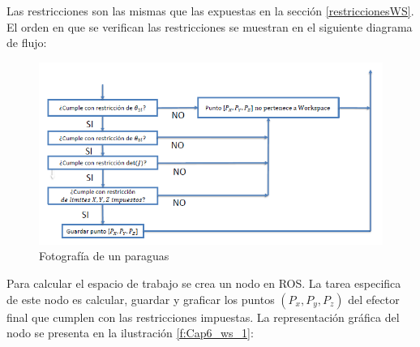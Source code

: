         \newpage

    Las restricciones son las mismas que las expuestas en la sección \ref{restriccionesWS}. El orden en que se verifican las restricciones se muestran en el siguiente diagrama de flujo:

             \begin{figure}[htb]
                \centering
                \includegraphics[width=1\linewidth]{Main/Chapter6/Images6/cap6_ws_3.png}
                \caption{Fotografía de un paraguas}
                \label{f:Cap6_ws_3}
            \end{figure}  


    Para calcular el espacio de trabajo se crea un nodo en ROS. La tarea especifica de este nodo es calcular, guardar y graficar los puntos $(P_x,P_y,P_z)$ del efector final que cumplen con las restricciones impuestas. 
    La representación gráfica del nodo se presenta en la ilustración \ref{f:Cap6_ws_1}: 
    
